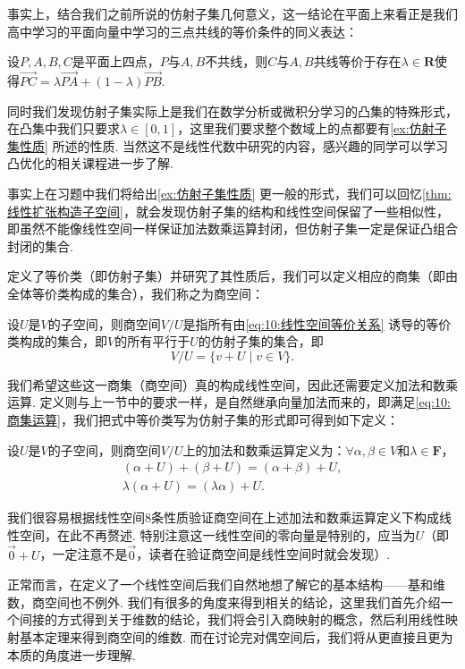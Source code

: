 \begin{solution}

\end{solution}

事实上，结合我们之前所说的仿射子集几何意义，这一结论在平面上来看正是我们高中学习的平面向量中学习的三点共线的等价条件的同义表达：
\begin{theorem}{}{}
    设$P,A,B,C$是平面上四点，$P$与$A,B$不共线，则$C$与$A,B$共线等价于存在$\lambda\in\mathbf{R}$使得$\overrightarrow{PC}=\lambda\overrightarrow{PA}+(1-\lambda)\overrightarrow{PB}$.
\end{theorem}
同时我们发现仿射子集实际上是我们在数学分析或微积分学习的凸集的特殊形式，在凸集中我们只要求$\lambda\in[0,1]$，这里我们要求整个数域上的点都要有\autoref{ex:仿射子集性质} 所述的性质. 当然这不是线性代数中研究的内容，感兴趣的同学可以学习凸优化的相关课程进一步了解.

事实上在习题中我们将给出\autoref*{ex:仿射子集性质} 更一般的形式，我们可以回忆\autoref{thm:线性扩张构造子空间}，就会发现仿射子集的结构和线性空间保留了一些相似性，即虽然不能像线性空间一样保证加法数乘运算封闭，但仿射子集一定是保证凸组合封闭的集合.

定义了等价类（即仿射子集）并研究了其性质后，我们可以定义相应的商集（即由全体等价类构成的集合），我们称之为商空间：
\begin{definition}{}{}
    设$U$是$V$的子空间，则商空间$V/U$是指所有由\autoref{eq:10:线性空间等价关系} 诱导的等价类构成的集合，即$V$的所有平行于$U$的仿射子集的集合，即
    \[V/U=\{v+U \mid v\in V\}.\]
\end{definition}
我们希望这些这一商集（商空间）真的构成线性空间，因此还需要定义加法和数乘运算. 定义则与上一节中的要求一样，是自然继承向量加法而来的，即满足\autoref{eq:10:商集运算}，我们把式中等价类写为仿射子集的形式即可得到如下定义：
\begin{definition}{}{}
    设$U$是$V$的子空间，则商空间$V/U$上的加法和数乘运算定义为：$\forall \alpha,\beta\in V$和$\lambda\in\mathbf{F}$，
    \begin{gather*}
        (\alpha+U)+(\beta+U)=(\alpha+\beta)+U, \\
        \lambda(\alpha+U)=(\lambda\alpha)+U.
    \end{gather*}
\end{definition}
我们很容易根据线性空间8条性质验证商空间在上述加法和数乘运算定义下构成线性空间，在此不再赘述. 特别注意这一线性空间的零向量是特别的，应当为$U$（即$\vec{0}+U$，一定注意不是$\vec{0}$，读者在验证商空间是线性空间时就会发现）.

正常而言，在定义了一个线性空间后我们自然地想了解它的基本结构——基和维数，商空间也不例外. 我们有很多的角度来得到相关的结论，这里我们首先介绍一个间接的方式得到关于维数的结论，我们将会引入商映射的概念，然后利用线性映射基本定理来得到商空间的维数. 而在讨论完对偶空间后，我们将从更直接且更为本质的角度进一步理解.

